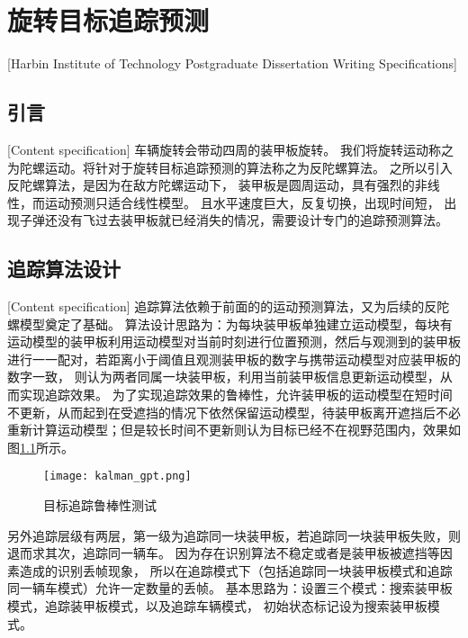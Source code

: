 

\chapter[旋转目标追踪预测]{旋转目标追踪预测}[Harbin Institute of Technology Postgraduate Dissertation Writing Specifications]

\section{引言}[Content specification]
车辆旋转会带动四周的装甲板旋转。
我们将旋转运动称之为陀螺运动。将针对于旋转目标追踪预测的算法称之为反陀螺算法。
之所以引入反陀螺算法，是因为在敌方陀螺运动下，
装甲板是圆周运动，具有强烈的非线性，而运动预测只适合线性模型。
且水平速度巨大，反复切换，出现时间短，
出现子弹还没有飞过去装甲板就已经消失的情况，需要设计专门的追踪预测算法。

\section{追踪算法设计}[Content specification]
追踪算法依赖于前面的的运动预测算法，又为后续的反陀螺模型奠定了基础。
算法设计思路为：为每块装甲板单独建立运动模型，每块有运动模型的装甲板利用运动模型对当前时刻进行位置预测，然后与观测到的装甲板进行一一配对，若距离小于阈值且观测装甲板的数字与携带运动模型对应装甲板的数字一致，
则认为两者同属一块装甲板，利用当前装甲板信息更新运动模型，从而实现追踪效果。
为了实现追踪效果的鲁棒性，允许装甲板的运动模型在短时间不更新，从而起到在受遮挡的情况下依然保留运动模型，待装甲板离开遮挡后不必重新计算运动模型；但是较长时间不更新则认为目标已经不在视野范围内，效果如图\ref{kalman_gpt}所示。
\begin{figure}[H]
    \centering
    \texttt{[image: kalman\_gpt.png]} 
    \caption{目标追踪鲁棒性测试} 
    \label{kalman_gpt} 
\end{figure} 
\par

另外追踪层级有两层，第一级为追踪同一块装甲板，若追踪同一块装甲板失败，则退而求其次，追踪同一辆车。
因为存在识别算法不稳定或者是装甲板被遮挡等因素造成的识别丢帧现象，
所以在追踪模式下（包括追踪同一块装甲板模式和追踪同一辆车模式）允许一定数量的丢帧。
基本思路为：设置三个模式：搜索装甲板模式，追踪装甲板模式，以及追踪车辆模式，
初始状态标记设为搜索装甲板模式。

